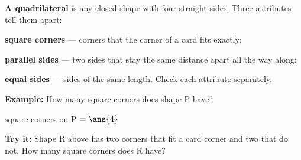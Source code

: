 \documentclass[12pt]{article}
\begin{document}


\begin{formulabox}
\textbf{A quadrilateral} is any closed shape with four straight sides. Three attributes tell them
apart:\par
\textbf{square corners} --- corners that the corner of a card fits exactly;\par
\textbf{parallel sides} --- two sides that stay the same distance apart all the way along;\par
\textbf{equal sides} --- sides of the same length. Check each attribute separately.
\end{formulabox}

\begin{examplebox}
\textbf{Example:} \quad How many square corners does shape P have?
\par\vspace{2pt}
\begin{center}
\end{center}

square corners on P $= \ans{4}$
\end{examplebox}

\begin{tryitbox}
\textbf{Try it:} \quad Shape R above has two corners that fit a card corner and two that do not.
How many square corners does R have?\\[2pt]
\end{tryitbox}
\end{document}
